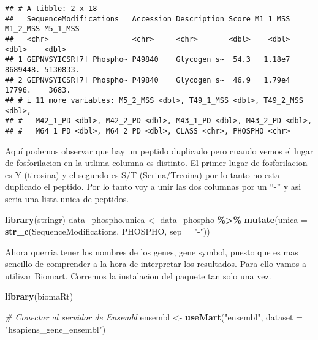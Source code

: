 \documentclass[
]{article}
\newenvironment{Shaded}{\begin{snugshade}}{\end{snugshade}}
\newcommand{\AttributeTok}[1]{\textcolor[rgb]{0.13,0.29,0.53}{#1}}
\newcommand{\CommentTok}[1]{\textcolor[rgb]{0.56,0.35,0.01}{\textit{#1}}}
\newcommand{\FunctionTok}[1]{\textcolor[rgb]{0.13,0.29,0.53}{\textbf{#1}}}
\newcommand{\NormalTok}[1]{#1}
\newcommand{\OtherTok}[1]{\textcolor[rgb]{0.56,0.35,0.01}{#1}}
\newcommand{\SpecialCharTok}[1]{\textcolor[rgb]{0.81,0.36,0.00}{\textbf{#1}}}
\newcommand{\StringTok}[1]{\textcolor[rgb]{0.31,0.60,0.02}{#1}}
\begin{document}
\begin{verbatim}
## # A tibble: 2 x 18
##   SequenceModifications   Accession Description Score M1_1_MSS M1_2_MSS M5_1_MSS
##   <chr>                   <chr>     <chr>       <dbl>    <dbl>    <dbl>    <dbl>
## 1 GEPNVSYICSR[7] Phospho~ P49840    Glycogen s~  54.3   1.18e7 8689448. 5130833.
## 2 GEPNVSYICSR[7] Phospho~ P49840    Glycogen s~  46.9   1.79e4   17796.    3683.
## # i 11 more variables: M5_2_MSS <dbl>, T49_1_MSS <dbl>, T49_2_MSS <dbl>,
## #   M42_1_PD <dbl>, M42_2_PD <dbl>, M43_1_PD <dbl>, M43_2_PD <dbl>,
## #   M64_1_PD <dbl>, M64_2_PD <dbl>, CLASS <chr>, PHOSPHO <chr>
\end{verbatim}

Aquí podemos observar que hay un peptido duplicado pero cuando vemos el
lugar de fosforilacion en la utlima columna es distinto. El primer lugar
de fosforilacion es Y (tirosina) y el segundo es S/T (Serina/Treoina)
por lo tanto no esta duplicado el peptido. Por lo tanto voy a unir las
dos columnas por un ``-'' y asi seria una lista unica de peptidos.

\begin{Shaded}
\begin{Highlighting}[]
\FunctionTok{library}\NormalTok{(stringr)}
\NormalTok{data\_phospho.unica }\OtherTok{\textless{}{-}}\NormalTok{ data\_phospho }\SpecialCharTok{\%\textgreater{}\%}
  \FunctionTok{mutate}\NormalTok{(}\AttributeTok{unica =} \FunctionTok{str\_c}\NormalTok{(SequenceModifications, PHOSPHO, }\AttributeTok{sep =} \StringTok{"{-}"}\NormalTok{))}
\end{Highlighting}
\end{Shaded}

Ahora querria tener los nombres de los genes, gene symbol, puesto que es
mas sencillo de comprender a la hora de interpretar los resultados. Para
ello vamos a utilizar Biomart. Corremos la instalacion del paquete tan
solo una vez.

\begin{Shaded}
\begin{Highlighting}[]
\FunctionTok{library}\NormalTok{(biomaRt)}
\end{Highlighting}
\end{Shaded}

\begin{Shaded}
\begin{Highlighting}[]
\CommentTok{\# Conectar al servidor de Ensembl}
\NormalTok{ensembl }\OtherTok{\textless{}{-}} \FunctionTok{useMart}\NormalTok{(}\StringTok{"ensembl"}\NormalTok{, }\AttributeTok{dataset =} \StringTok{"hsapiens\_gene\_ensembl"}\NormalTok{)}
\end{Highlighting}
\end{Shaded}
\end{document}
